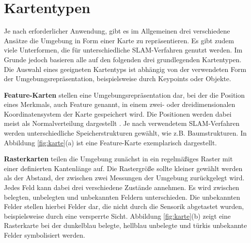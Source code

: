 


\section[Kartentypen (Kopp)]{Kartentypen}
\label{sec:Karten}

Je nach erforderlicher Anwendung, gibt es im Allgemeinen drei verschiedene Ansätze die Umgebung in Form einer Karte zu repräsentieren. Es gibt zudem viele Unterformen, die für unterschiedliche SLAM-Verfahren genutzt werden. Im Grunde jedoch basieren alle auf den folgenden drei grundlegenden Kartentypen. Die Auswahl eines geeigneten Kartentyps ist abhängig von der verwendeten Form der Umgebungsrepräsentation, beispielsweise durch Keypoints oder Objekte. 

\textbf{Feature-Karten} stellen eine Umgebungsrepräsentation dar, bei der die Position eines Merkmals, auch Feature genannt, in einem zwei- oder dreidimensionalen Koordinatensystem der Karte gespeichert wird. Die Positionen werden dabei meist als Normalverteilung dargestellt \cite{Stachniss2016}. Je nach verwendetem SLAM-Verfahren werden unterschiedliche Speicherstrukturen gewählt, wie z.B. Baumstrukturen. In Abbildung \ref{fig:karte}(a) ist eine Feature-Karte exemplarisch dargestellt.

\textbf{Rasterkarten} teilen die Umgebung zunächst in ein regelmäßiges Raster mit einer definierten Kantenlänge auf. Die Rastergröße sollte kleiner gewählt werden als der Abstand, der zwischen zwei Messungen der Umgebung zurückgelegt wird. Jedes Feld kann dabei drei verschiedene Zustände annehmen. Es wird zwischen belegten, unbelegten und unbekannten Feldern unterschieden. Die unbekannten Felder stellen hierbei Felder dar, die nicht durch die Sensorik abgetastet wurden, beispielsweise durch eine versperrte Sicht. Abbildung \ref{fig:karte}(b) zeigt eine Rasterkarte bei der dunkelblau belegte, hellblau unbelegte und türkis unbekannte Felder symbolisiert werden. 

